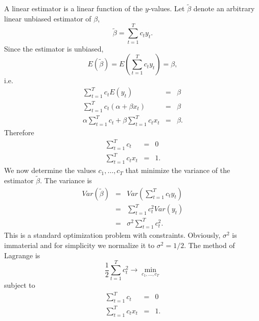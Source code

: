 \documentclass{article}
\begin{document}
A linear estimator is a linear function of the $y$-values. Let $\tilde{\beta}
$ denote an arbitrary linear unbiased estimator of $\beta $,
\[ \tilde{\beta}=\sum_{t=1}^{T}c_{t}y_{t}. \]
Since the estimator is unbiased,
\[ E(\tilde{\beta}) =E\left( \sum_{t=1}^{T}c_{t}y_{t}\right) =\beta, \]
i.e.
\begin{eqnarray*}
\sum_{t=1}^{T}c_{t}E\left( y_{t}\right) &=&\beta \\
\sum_{t=1}^{T}c_{t}\left( \alpha +\beta x_{t}\right) &=&\beta \\
\alpha \sum_{t=1}^{T}c_{t}+\beta \sum_{t=1}^{T}c_{t}x_{t} &=&\beta .
\end{eqnarray*}%
Therefore
\begin{eqnarray*}
\sum_{t=1}^{T}c_{t} &=&0 \\
\sum_{t=1}^{T}c_{t}x_{t} &=&1.
\end{eqnarray*}
We now determine the values $c_{1},\ldots ,c_{T}$ that minimize the variance
of the estimator $\tilde{\beta}$. The variance is
\begin{eqnarray*}
Var(\tilde{\beta}) &=&Var\left( \sum_{t=1}^{T}c_{t}y_{t}\right)\\
&=&\sum_{t=1}^{T}c_{t}^{2}Var\left( y_{t}\right) \\
&=&\sigma ^{2}\sum_{t=1}^{T}c_{t}^{2}.
\end{eqnarray*}
This is a standard optimization problem with constraints. Obviously, $\sigma
^{2}$ is immaterial and for simplicity we normalize it to $\sigma ^{2}=1/2$.
The method of Lagrange is
\[
\frac{1}{2}\sum_{t=1}^{T}c_{t}^{2}\longrightarrow \min_{c_{1},\ldots ,c_{T}} 
\]%
subject to
\begin{eqnarray*}
\sum_{t=1}^{T}c_{t} &=&0 \\
\sum_{t=1}^{T}c_{t}x_{t} &=&1.
\end{eqnarray*}
\end{document}
